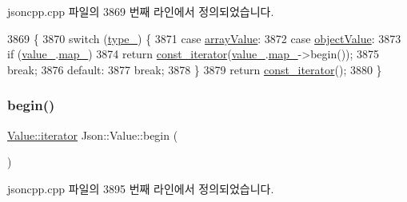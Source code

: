 jsoncpp.\+cpp 파일의 3869 번째 라인에서 정의되었습니다.


\begin{DoxyCode}
3869                                        \{
3870   \textcolor{keywordflow}{switch} (\hyperlink{class_json_1_1_value_abd222c2536dc88bf330dedcd076d2356}{type\_}) \{
3871   \textcolor{keywordflow}{case} \hyperlink{namespace_json_a7d654b75c16a57007925868e38212b4eadc8f264f36b55b063c78126b335415f4}{arrayValue}:
3872   \textcolor{keywordflow}{case} \hyperlink{namespace_json_a7d654b75c16a57007925868e38212b4eae8386dcfc36d1ae897745f7b4f77a1f6}{objectValue}:
3873     \textcolor{keywordflow}{if} (\hyperlink{class_json_1_1_value_aef578244546212705b9f81eb84d7e151}{value\_}.\hyperlink{union_json_1_1_value_1_1_value_holder_a1e7a5b86d4f52234f55c847ad1ce389a}{map\_})
3874       \textcolor{keywordflow}{return} \hyperlink{class_json_1_1_value_af92282ca92b58b320debd486afb7696a}{const\_iterator}(\hyperlink{class_json_1_1_value_aef578244546212705b9f81eb84d7e151}{value\_}.\hyperlink{union_json_1_1_value_1_1_value_holder_a1e7a5b86d4f52234f55c847ad1ce389a}{map\_}->begin());
3875     \textcolor{keywordflow}{break};
3876   \textcolor{keywordflow}{default}:
3877     \textcolor{keywordflow}{break};
3878   \}
3879   \textcolor{keywordflow}{return} \hyperlink{class_json_1_1_value_af92282ca92b58b320debd486afb7696a}{const\_iterator}();
3880 \}
\end{DoxyCode}
\mbox{\label{class_json_1_1_value_a2d45bb2e68e8f22fe356d7d955ebd3c9}} 
\subsubsection{\texorpdfstring{begin()}{begin()}\hspace{0.1cm}{\footnotesize\ttfamily [2/2]}}
{\footnotesize\ttfamily \hyperlink{class_json_1_1_value_a341cdf2e01f8b3c5b7317aa2f0768c53}{Value\+::iterator} Json\+::\+Value\+::begin (\begin{DoxyParamCaption}{ }\end{DoxyParamCaption})}



jsoncpp.\+cpp 파일의 3895 번째 라인에서 정의되었습니다.


